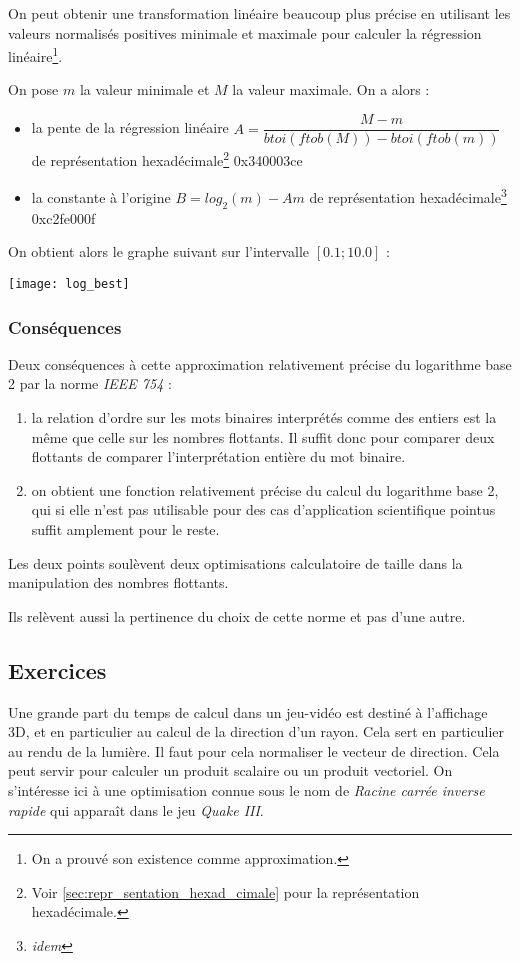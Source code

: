 \documentclass[../../main.tex]{subfiles}
\begin{document}
On peut obtenir une transformation linéaire beaucoup plus précise en utilisant les valeurs normalisés positives minimale et maximale pour calculer la régression linéaire\footnote{On a prouvé son existence comme approximation.}. 

On pose $m$ la valeur minimale et $M$ la valeur maximale. On a alors :
\begin{itemize}
  \item la pente de la régression linéaire $A = \dfrac{M - m}{btoi(ftob(M)) - btoi(ftob(m))}$ de représentation hexadécimale\footnote{Voir \ref{sec:repr_sentation_hexad_cimale} pour la représentation hexadécimale.} \textsf{0x340003ce}
  \item la constante à l'origine $B = log_2(m) - Am$ de représentation hexadécimale\footnote{\textit{idem}} \textsf{0xc2fe000f}
\end{itemize}
On obtient alors le graphe suivant sur l'intervalle $[0.1; 10.0]$ :
\begin{center}
  \texttt{[image: log\_best]}
\end{center}
\subsubsection{Conséquences} \label{ssub:cons_quences}
Deux conséquences à cette approximation relativement précise du logarithme base 2 par la norme \textit{IEEE 754} :
\begin{enumerate}
  \item la relation d'ordre sur les mots binaires interprétés comme des entiers est la même que celle sur les nombres flottants. Il suffit donc pour comparer deux flottants de comparer l'interprétation entière du mot binaire.
  \item on obtient une fonction relativement précise du calcul du logarithme base 2, qui si elle n'est pas utilisable pour des cas d'application scientifique pointus suffit amplement pour le reste.
\end{enumerate}
Les deux points soulèvent deux optimisations calculatoire de taille dans la manipulation des nombres flottants.

Ils relèvent aussi la pertinence du choix de cette norme et pas d'une autre.
\subsection{Exercices}
 Une grande part du temps de calcul dans un jeu-vidéo est destiné à l'affichage 3D, et en particulier au calcul de la direction d'un rayon. Cela sert en particulier au rendu de la lumière. Il faut pour cela normaliser le vecteur de direction. Cela peut servir pour calculer un produit scalaire ou un produit vectoriel. On s'intéresse ici à une optimisation connue sous le nom de \textit{Racine carrée inverse rapide} qui apparaît dans le jeu \textit{Quake III}.
\end{document}
